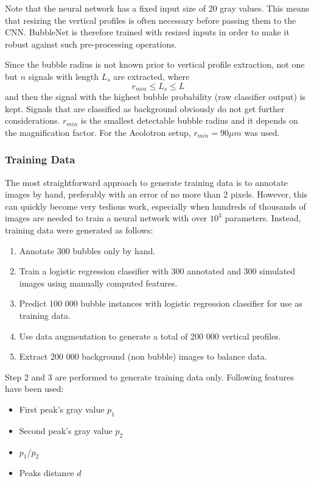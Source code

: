 	Note that the neural network has a fixed input size of 20 gray values. This means that resizing the vertical profiles is often necessary before passing them to the CNN. BubbleNet is therefore trained with resized inputs in order to make it robust against such pre-processing operations. 
	
	Since the bubble radius is not known prior to vertical profile extraction, not one but $n$ signals with length $L_s$ are extracted, where 
	\begin{equation}
		r_{min} \leq L_s \leq L
	\end{equation}
	and then the signal with the highest bubble probability (raw classifier output) is kept. Signals that are classified as background obviously do not get further considerations. $r_{min}$ is the smallest detectable bubble radius and it depends on the magnification factor. For the Aeolotron setup, $r_{min} = 90 \mu m$ was used.

		\subsubsection{Training Data}
			The most straightforward approach to generate training data is to annotate images by hand, preferably with an error of no more than 2 pixels. However, this can quickly become very tedious work, especially when hundreds of thousands of images are needed to train a neural network with over $10^{3}$ parameters. Instead, training data were generated as follows:
			\begin{enumerate}
				\item Annotate 300 bubbles only by hand.
				\item Train a logistic regression classifier with 300 annotated and 300 simulated images using manually computed features.
				\item Predict 100 000 bubble instances with logistic regression classifier for use as training data. 
				\item Use data augmentation to generate a total of 200 000 vertical profiles. 				
				\item Extract 200 000 background (non bubble) images to balance data.
			\end{enumerate}
			
			Step 2 and 3 are performed to generate training data only. Following features have been used:
			\begin{itemize}
				\item First peak's gray value $p_1$
				\item Second peak's gray value $p_2$
				\item $p_1/p_2$
				\item Peaks distance $d$
			\end{itemize}
			
